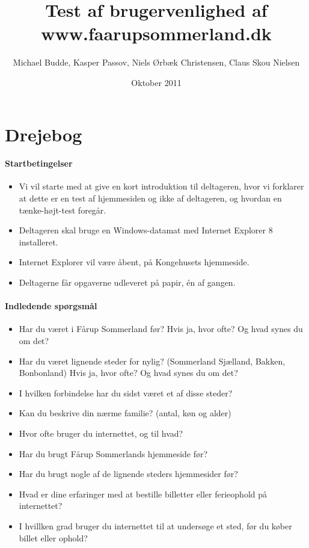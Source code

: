 \documentclass[10pt,a4paper]{article}      %
\author{Michael Budde, Kasper Passov, Niels Ørbæk Christensen, Claus Skou Nielsen}
\title{Test af brugervenlighed af www.faarupsommerland.dk}
\date{Oktober 2011}
\begin{document}
\hfuzz=50pt
\maketitle
\newpage

\pagestyle{fancy}
\chead{}
\cfoot{}
\renewcommand{\headrulewidth}{0.4pt}
\renewcommand{\footrulewidth}{0.4pt}


\section{Drejebog}

\paragraph{Startbetingelser}
\begin{itemize}
\item Vi vil starte med at give en kort introduktion til deltageren, hvor vi
forklarer at dette er en test af hjemmesiden og ikke af deltageren, og hvordan
en tænke-højt-test foregår.
\item Deltageren skal bruge en Windows-datamat med Internet Explorer 8
installeret.
\item Internet Explorer vil være åbent, på Kongehusets hjemmeside.
\item Deltagerne får opgaverne udleveret på papir, én af gangen.
\end{itemize}

\paragraph{Indledende spørgsmål}
\begin{itemize}
\item Har du været i Fårup Sommerland før? Hvis ja, hvor ofte? Og hvad synes du
om det?
\item Har du været lignende steder for nylig? (Sommerland Sjælland, Bakken,
Bonbonland) Hvis ja, hvor ofte? Og hvad synes du om det?
\item I hvilken forbindelse har du sidst været et af disse steder?
\item Kan du beskrive din nærme familie? (antal, køn og alder)
\item Hvor ofte bruger du internettet, og til hvad?
\item Har du brugt Fårup Sommerlands hjemmeside før?
\item Har du brugt nogle af de lignende steders hjemmesider før?
\item Hvad er dine erfaringer med at bestille billetter eller ferieophold på
internettet?
\item I hvillken grad bruger du internettet til at undersøge et sted, før du
køber billet eller ophold?
\end{itemize}
\end{document}
